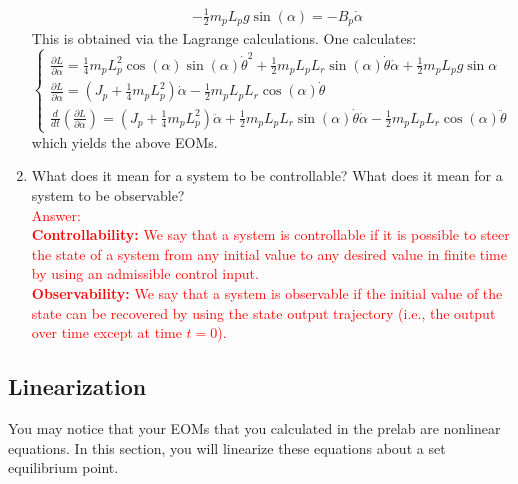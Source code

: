 \documentclass[12pt]{report}
\newcommand\drew[1]{\textcolor{red}{#1}}
\newcommand{\pder}[2]{\frac{\partial #1}{\partial #2}}
\begin{document}
\begin{enumerate}
{\begin{align*}
                   & - \frac{1}{2} m_p L_{p} g \sin(\alpha) = - B_p \dot{\alpha}
              \end{align*}
              This is obtained via the Lagrange calculations. One calculates:
              \[
                  \begin{cases}
                      \pder{L}{\alpha}=\frac{1}{4}m_pL_p^2\cos{(\alpha)}\sin{(\alpha)}\dot{\theta}^2+\frac{1}{2}m_pL_pL_r\sin{(\alpha)}\dot{\theta}\dot{\alpha}+ \frac{1}{2}m_pL_pg\sin{\alpha} \\
                      \pder{L}{\dot{\alpha}}= \left(J_p+\frac{1}{4}m_pL_p^2\right)\dot{\alpha}-\frac{1}{2}m_pL_pL_r\cos{(\alpha)}\dot{\theta}                                                   \\
                      \frac{d}{dt} \left(\pder{L}{\dot{\alpha}}\right)= \left(J_p+\frac{1}{4}m_pL_p^2\right)\ddot{\alpha}+\frac{1}{2}m_pL_pL_r\sin{(\alpha)}\dot{\theta}\dot{\alpha}-\frac{1}{2}m_pL_pL_r\cos{(\alpha)} \ddot{\theta}
                  \end{cases}
              \]
              which yields the above EOMs.}
    \item What does it mean for a system to be controllable? What does it mean for a system to be observable?\\
          \drew{Answer:\\
              \textbf{Controllability:} We say that a system is controllable if it is possible to steer the state of a system from any initial value to any desired value in finite time by using an admissible control input.\\
              \textbf{Observability:} We say that a system is observable if the initial value of the state can be recovered by using the state output trajectory (i.e., the output over time except at time $t=0$).}
\end{enumerate}

\subsection{Linearization}\label{subsubsection:lab2_linearize}
You may notice that your EOMs that you calculated in the prelab are nonlinear equations. In this section, you will linearize these equations about a set equilibrium point.
\end{document}
